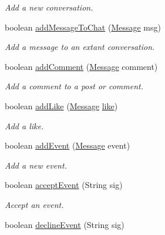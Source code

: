 \begin{DoxyCompactItemize}
\begin{DoxyCompactList}\small\item\em Add a new conversation. \end{DoxyCompactList}\item 
boolean \hyperlink{classballmerpeak_1_1turtlenet_1_1server_1_1Database_a42de72fca336efc18a3c486749289b50}{add\-Message\-To\-Chat} (\hyperlink{classballmerpeak_1_1turtlenet_1_1shared_1_1Message}{Message} msg)
\begin{DoxyCompactList}\small\item\em Add a message to an extant conversation. \end{DoxyCompactList}\item 
boolean \hyperlink{classballmerpeak_1_1turtlenet_1_1server_1_1Database_a1bfae51747f69a2dd125d9c915b980d4}{add\-Comment} (\hyperlink{classballmerpeak_1_1turtlenet_1_1shared_1_1Message}{Message} comment)
\begin{DoxyCompactList}\small\item\em Add a comment to a post or comment. \end{DoxyCompactList}\item 
boolean \hyperlink{classballmerpeak_1_1turtlenet_1_1server_1_1Database_af22fa4b19c7863929894a3ed278a174c}{add\-Like} (\hyperlink{classballmerpeak_1_1turtlenet_1_1shared_1_1Message}{Message} \hyperlink{classballmerpeak_1_1turtlenet_1_1server_1_1Database_ac2c2361722304a6446d5cd01cb0c5d3b}{like})
\begin{DoxyCompactList}\small\item\em Add a like. \end{DoxyCompactList}\item 
boolean \hyperlink{classballmerpeak_1_1turtlenet_1_1server_1_1Database_a484dad4e2e272c608996a4a6bbb463a4}{add\-Event} (\hyperlink{classballmerpeak_1_1turtlenet_1_1shared_1_1Message}{Message} event)
\begin{DoxyCompactList}\small\item\em Add a new event. \end{DoxyCompactList}\item 
boolean \hyperlink{classballmerpeak_1_1turtlenet_1_1server_1_1Database_a30d0cd474644f531f6bfded6c9a63506}{accept\-Event} (String sig)
\begin{DoxyCompactList}\small\item\em Accept an event. \end{DoxyCompactList}\item 
boolean \hyperlink{classballmerpeak_1_1turtlenet_1_1server_1_1Database_a2618960f1f28ee6fb130fba5077d8088}{decline\-Event} (String sig)

\end{DoxyCompactItemize}
